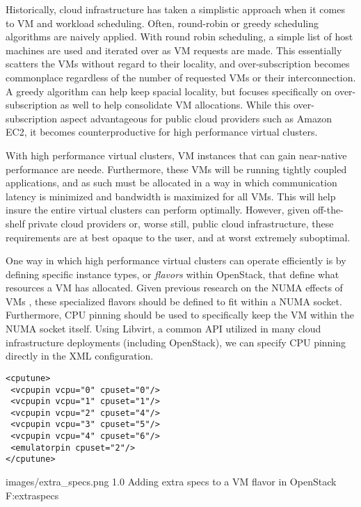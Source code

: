 Historically, cloud infrastructure has taken a simplistic approach when it comes to VM and workload scheduling. Often, round-robin or greedy \cite{Younge2011eagc} scheduling algorithms are naively applied. With round robin scheduling, a simple list of host machines are used and iterated over as VM requests are made. This essentially scatters the VMs without regard to their locality, and over-subscription becomes commonplace regardless of the number of requested VMs or their interconnection. A greedy algorithm can help keep spacial locality, but focuses specifically on over-subscription as well to help consolidate VM allocations. While this over-subscription aspect advantageous for public cloud providers such as Amazon EC2, it becomes counterproductive for high performance virtual clusters.

With high performance virtual clusters, VM instances that can gain near-native performance are neede. Furthermore, these VMs will be running tightly coupled applications, and as such must be allocated in a way in which communication latency is minimized and bandwidth is maximized for all VMs. This will help insure the entire virtual clusters can perform optimally.  However, given off-the-shelf private cloud providers or, worse still, public cloud infrastructure, these requirements are at best opaque to the user, and at worst extremely suboptimal.

One way in which high performance virtual clusters can operate efficiently is by defining specific instance types, or \emph{flavors} within OpenStack, that define what resources a VM has allocated.  Given previous research on the NUMA effects of VMs \cite{openstack-numa}, these specialized flavors should be defined to fit within a NUMA socket.  Furthermore, CPU pinning should be used to specifically keep the VM within the NUMA socket itself.  Using Libvirt, a common API utilized in many cloud infrastructure deployments (including OpenStack), we can specify CPU pinning directly in the XML configuration.

\begin{verbatim}
<cputune>
 <vcpupin vcpu="0" cpuset="0"/>
 <vcpupin vcpu="1" cpuset="1"/>
 <vcpupin vcpu="2" cpuset="4"/>
 <vcpupin vcpu="3" cpuset="5"/>
 <vcpupin vcpu="4" cpuset="6"/>
 <emulatorpin cpuset="2"/>
</cputune>
\end{verbatim}

  {images/extra_specs.png}
  {1.0}
  {Adding extra specs to a VM flavor in OpenStack}
  {F:extraspecs}

